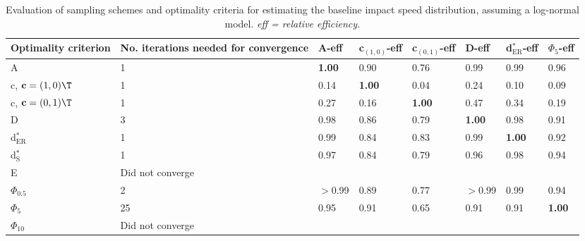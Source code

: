 \begin{table}[htb!]
\centering
\caption{Evaluation of sampling schemes and optimality criteria for estimating the baseline impact speed distribution, assuming a log-normal model. \textit{eff = relative efficiency.}} 
\label{tab:baseline_impact_speed}
\begin{tabular}{p{2.75cm}R{3.125cm}R{1.1cm}R{1.3cm}R{1.3cm}R{1.1cm}R{1.2cm}R{1.2cm}}
 Optimality criterion & No. iterations needed for convergence & A-eff & c$_{(1,0)}$-eff & c$_{(0,1)}$-eff & D-eff & d$^*_{\mathrm{ER}}$-eff & $\Phi_5$-eff \\ 
  \hline
A & 1 & \textbf{1.00} & 0.90 & 0.76 & 0.99 & 0.99 & 0.96 \\ 
  c, $\mathbf{c} = (1,0)\T$ & 1 & 0.14 & \textbf{1.00} & 0.04 & 0.24 & 0.10 & 0.09 \\ 
  c, $\mathbf{c} = (0,1)\T$ & 1 & 0.27 & 0.16 & \textbf{1.00} & 0.47 & 0.34 & 0.19 \\ 
  D & 3 & 0.98 & 0.86 & 0.79 & \textbf{1.00} & 0.98 & 0.91 \\ 
  d$^*_{\mathrm{ER}}$ & 1 & 0.99 & 0.84 & 0.83 & 0.99 & \textbf{1.00} & 0.92 \\ 
  d$^*_{\mathrm{S}}$ & 1 & 0.97 & 0.84 & 0.79 & 0.96 & 0.98 & 0.94 \\ 
  E & Did not converge &  &  &  &  &  &  \\ 
  $\Phi_{0.5}$ & 2 & $>$0.99 & 0.89 & 0.77 & $>$0.99 & 0.99 & 0.94 \\ 
  $\Phi_5$ & 25 & 0.95 & 0.91 & 0.65 & 0.91 & 0.91 & \textbf{1.00} \\ 
  $\Phi_{10}$ & Did not converge &  &  &  &  &  &  \\ 
   \hline
\end{tabular}
\end{table}
